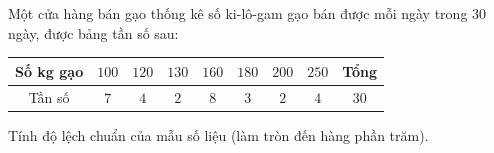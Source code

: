\begin{ex}
Một cửa hàng bán gạo thống kê số ki-lô-gam gạo bán được mỗi ngày trong $30$ ngày, được bảng tần số sau:
\begin{center}
\begin{tabular}{|c|c|c|c|c|c|c|c|c|}\hline
Số kg gạo & $100$ & $120$ & $130$ & $160$ & $180$ & $200$ & $250$ & Tổng\\\hline
Tần số & $7$ & $4$ & $2$ & $8$ & $3$ & $2$ & $4$ & $30$\\\hline
\end{tabular}
\end{center}
Tính độ lệch chuẩn của mẫu số liệu (làm tròn đến hàng phần trăm).
\end{ex}
